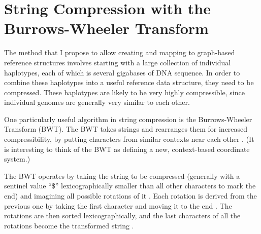 \documentclass[11pt,proposal]{ucthesis}
\begin{document}

    
    
    
        
        
    

        
    

\section{String Compression with the Burrows-Wheeler Transform}
\label{sec:bwt}

The method that I propose to allow creating and mapping to graph-based reference structures involves starting with a large collection of individual haplotypes, each of which is several gigabases of DNA sequence. In order to combine these haplotypes into a useful reference data structure, they need to be compressed. These haplotypes are likely to be very highly compressible, since individual genomes are generally very similar to each other.

One particularly useful algorithm in string compression is the Burrows-Wheeler Transform (BWT). The BWT takes strings and rearranges them for increased compressibility, by putting characters from similar contexts near each other \cite{burrows1994block}. (It is interesting to think of the BWT as defining a new, context-based coordinate system.)

The BWT operates by taking the string to be compressed (generally with a sentinel value ``\$'' lexicographically smaller than all other characters to mark the end) and imagining all possible rotations of it \cite{burrows1994block, ferragina2000opportunistic}. Each rotation is derived from the previous one by taking the first character and moving it to the end \cite{burrows1994block}. The rotations are then sorted lexicographically, and the last characters of all the rotations become the transformed string \cite{burrows1994block}.
\end{document}
